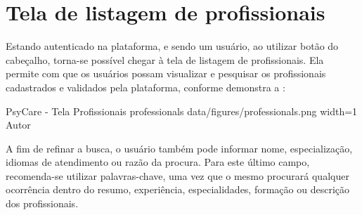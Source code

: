 \section{Tela de listagem de profissionais}
\label{sec:profissionais}

Estando autenticado na plataforma, e sendo um usuário, ao utilizar botão  do cabeçalho, torna-se possível chegar à tela de listagem de profissionais. Ela permite com que os usuários possam visualizar e pesquisar os profissionais cadastrados e validados pela plataforma, conforme demonstra a :

\image
    {PsyCare - Tela Profissionais}
    {professionals}
    {data/figures/professionals.png}
    {width=1\textwidth}
    {Autor}

A fim de refinar a busca, o usuário também pode informar nome, especialização, idiomas de atendimento ou razão da procura. Para este último campo, recomenda-se utilizar palavras-chave, uma vez que o mesmo procurará qualquer ocorrência dentro do resumo, experiência, especialidades, formação ou descrição dos profissionais.
